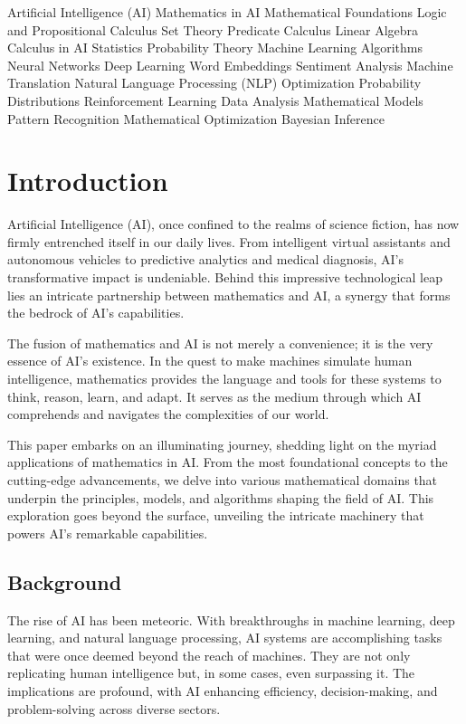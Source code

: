 \documentclass[conference]{IEEEtran}
\begin{document}
    \begin{IEEEkeywords}Artificial Intelligence (AI)
    Mathematics in AI
    Mathematical Foundations
    Logic and Propositional Calculus
    Set Theory
    Predicate Calculus
    Linear Algebra
    Calculus in AI
    Statistics
    Probability Theory
    Machine Learning Algorithms
    Neural Networks
    Deep Learning
    Word Embeddings
    Sentiment Analysis
    Machine Translation
    Natural Language Processing (NLP)
    Optimization
    Probability Distributions
    Reinforcement Learning
    Data Analysis
    Mathematical Models
    Pattern Recognition
    Mathematical Optimization
    Bayesian Inference
    \end{IEEEkeywords}

    \section{Introduction}
      Artificial Intelligence (AI), once confined to the realms of science fiction, has now firmly entrenched itself in our daily lives. From intelligent virtual assistants and autonomous vehicles to predictive analytics and medical diagnosis, AI's transformative impact is undeniable. Behind this impressive technological leap lies an intricate partnership between mathematics and AI, a synergy that forms the bedrock of AI's capabilities.

The fusion of mathematics and AI is not merely a convenience; it is the very essence of AI's existence. In the quest to make machines simulate human intelligence, mathematics provides the language and tools for these systems to think, reason, learn, and adapt. It serves as the medium through which AI comprehends and navigates the complexities of our world.

This paper embarks on an illuminating journey, shedding light on the myriad applications of mathematics in AI. From the most foundational concepts to the cutting-edge advancements, we delve into various mathematical domains that underpin the principles, models, and algorithms shaping the field of AI. This exploration goes beyond the surface, unveiling the intricate machinery that powers AI's remarkable capabilities.
    \subsection{Background}
    The rise of AI has been meteoric. With breakthroughs in machine learning, deep learning, and natural language processing, AI systems are accomplishing tasks that were once deemed beyond the reach of machines. They are not only replicating human intelligence but, in some cases, even surpassing it. The implications are profound, with AI enhancing efficiency, decision-making, and problem-solving across diverse sectors.
\end{document}
